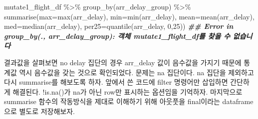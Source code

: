 \documentclass[
]{book}
\newenvironment{Shaded}{\begin{snugshade}}{\end{snugshade}}
\newcommand{\AttributeTok}[1]{\textcolor[rgb]{0.77,0.63,0.00}{#1}}
\newcommand{\DecValTok}[1]{\textcolor[rgb]{0.00,0.00,0.81}{#1}}
\newcommand{\DocumentationTok}[1]{\textcolor[rgb]{0.56,0.35,0.01}{\textbf{\textit{#1}}}}
\newcommand{\FunctionTok}[1]{\textcolor[rgb]{0.00,0.00,0.00}{#1}}
\newcommand{\NormalTok}[1]{#1}
\newcommand{\SpecialCharTok}[1]{\textcolor[rgb]{0.00,0.00,0.00}{#1}}
\theoremstyle{definition}
\theoremstyle{definition}
\theoremstyle{definition}
\theoremstyle{definition}
\theoremstyle{remark}
\begin{document}
\begin{Shaded}
\begin{Highlighting}[]
\NormalTok{mutate1\_flight\_df }\SpecialCharTok{\%\textgreater{}\%} 
  \FunctionTok{group\_by}\NormalTok{(arr\_delay\_group) }\SpecialCharTok{\%\textgreater{}\%} 
  \FunctionTok{summarise}\NormalTok{(}\AttributeTok{max=}\FunctionTok{max}\NormalTok{(arr\_delay),}
            \AttributeTok{min=}\FunctionTok{min}\NormalTok{(arr\_delay), }
            \AttributeTok{mean=}\FunctionTok{mean}\NormalTok{(arr\_delay), }
            \AttributeTok{med=}\FunctionTok{median}\NormalTok{(arr\_delay), }
            \AttributeTok{per25=}\FunctionTok{quantile}\NormalTok{(arr\_delay, }\DecValTok{0}\NormalTok{,}\DecValTok{25}\NormalTok{))}
\DocumentationTok{\#\# Error in group\_by(., arr\_delay\_group): 객체 \textquotesingle{}mutate1\_flight\_df\textquotesingle{}를 찾을 수 없습니다}
\end{Highlighting}
\end{Shaded}

결과값을 살펴보면 no delay 집단의 경우 arr\_delay 값이 음수값을 가지기 때문에 통계값 역시 음수값을 갖는 것으로 확인되었다. 문제는 na 집단이다. na 집단을 제외하고 다시 summarise를 해보도록 하자. 앞에서 쓴 코드에 filter 명령어만 삽입하면 간단하게 해결된다. !is.na()가 na가 아닌 row만 표시하는 옵션임을 기억하자. 마지막으로 summarise 함수의 작동방식을 제대로 이해하기 위해 아웃풋을 final이라는 dataframe으로 별도로 저장해보자.
\end{document}
